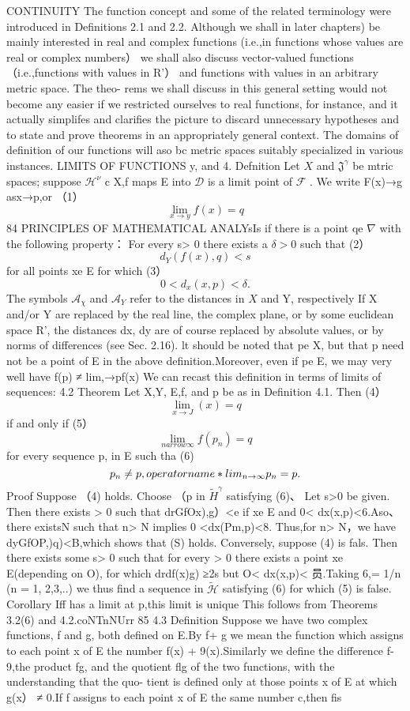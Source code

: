 CONTINUITY The function concept and some of the related terminology were introduced in Definitions 2.1 and 2.2. Although we shall in later chapters) be mainly interested in real and complex functions (i.e.,in functions whose values are real or complex numbers） we shall also discuss vector-valued functions （i.e.,functions with values in R'） and functions with values in an arbitrary metric space. The theo- rems we shall discuss in this general setting would not become any easier if we restricted ourselves to real functions, for instance, and it actually simplifes and clarifies the picture to discard unnecessary hypotheses and to state and prove theorems in an appropriately general context. The domains of definition of our functions will aso bc metric spaces suitably specialized in various instances. LIMITS OF FUNCTIONS y, and 4. Defnition Let $X$ and ${\mathfrak{J}}^{\gamma}$ be mtric spaces; suppose ${\mathcal{H}}^{\nu}$ c X,f maps E into $\textstyle{\mathcal{D}}$ is a limit point of ${\mathcal{F}}$ . We write F(x)→g asx→p,or （1） $$ \operatorname*{lim}_{x\to y}f(x)=q $$84 PRINCIPLES OF MATHEMATICAL ANALYsIs if there is a point qe $\textstyle\nabla$ with the following property： For every s> 0 there exists a $\scriptstyle\delta>0$ such that (2） $$ d_{Y}(f(x),q)<s $$ for all points xe E for which (3） $$ 0<d_{x}(x,p)<\delta. $$ The symbols ${\mathcal{A}}_{\chi}$ and ${\mathcal{A}}_{Y}$ refer to the distances in $X$ and Y, respectively If X and/or Y are replaced by the real line, the complex plane, or by some euclidean space R', the distances dx, dy are of course replaced by absolute values, or by norms of differences (see Sec. 2.16). lt should be noted that pe X, but that p need not be a point of E in the above definition.Moreover, even if pe E, we may very well have f(p) ≠ lim,→pf(x) We can recast this definition in terms of limits of sequences: 4.2 Theorem Let X,Y, E,f, and p be as in Definition 4.1. Then (4） $$ \operatorname*{lim}_{x\to J}(x)=q $$ if and only if (5） $$ \operatorname*{lim}_{n arrow\infty}f(p_{n})=q $$ for every sequence {p,} in E such tha (6) $$ p_{n}\neq p,\\operatorname*{lim}_{n\to\infty}p_{n}=p. $$ Proof Suppose （4) holds. Choose （p in ${\widetilde{H}}^{\gamma}$ satisfying (6)、 Let s>0 be given. Then there exists > 0 such that drGfOx),g）<e if xe E and 0< dx(x,p)<6.Aso、there existsN such that n> N implies 0 <dx(Pm,p)<8. Thus,for n> N，we have dyGfOP,)q)<B,which shows that (S) holds. Conversely, suppose (4) is fals. Then there exists some s> 0 such that for every > 0 there exists a point xe E(depending on O), for which drdf(x)g) ≥2s but O< dx(x,p)< 员.Taking 6,= 1/n (n = 1, 2,3,..) we thus find a sequence in ${\widetilde{\mathcal{H}}}$ satisfying (6) for which (5) is false. Corollary Iff has a limit at p,this limit is unique This follows from Theorems 3.2(6) and 4.2.coNTnNUrr 85 4.3 Definition Suppose we have two complex functions, f and g, both defined on E.By f+ g we mean the function which assigns to each point x of E the number f(x) + 9(x).Similarly we define the difference f-9,the product fg, and the quotient flg of the two functions, with the understanding that the quo- tient is defined only at those points x of E at which g(x） ≠ 0.If f assigns to each point x of E the same number c,then fis 